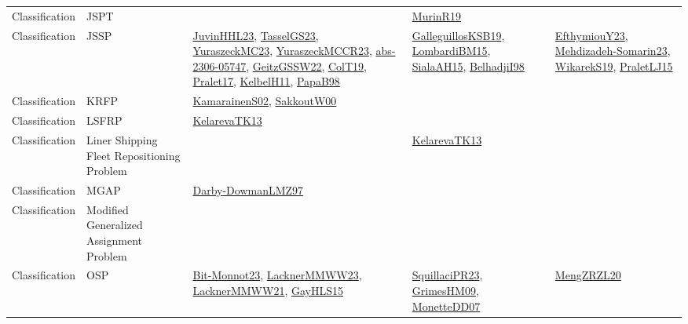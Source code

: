 {\begin{longtable}{lp{3cm}>{\raggedright}p{6cm}>{\raggedright}p{6cm}p{8cm}}
Classification & JSPT &  & \href{papers/MurinR19.pdf}{MurinR19}\cite{MurinR19} & \\
Classification & JSSP & \href{papers/JuvinHHL23.pdf}{JuvinHHL23}\cite{JuvinHHL23}, \href{papers/TasselGS23.pdf}{TasselGS23}\cite{TasselGS23}, \href{papers/YuraszeckMC23.pdf}{YuraszeckMC23}\cite{YuraszeckMC23}, \href{articles/YuraszeckMCCR23.pdf}{YuraszeckMCCR23}\cite{YuraszeckMCCR23}, \href{articles/abs-2306-05747.pdf}{abs-2306-05747}\cite{abs-2306-05747}, \href{papers/GeitzGSSW22.pdf}{GeitzGSSW22}\cite{GeitzGSSW22}, \href{papers/ColT19.pdf}{ColT19}\cite{ColT19}, \href{papers/Pralet17.pdf}{Pralet17}\cite{Pralet17}, \href{articles/KelbelH11.pdf}{KelbelH11}\cite{KelbelH11}, \href{articles/PapaB98.pdf}{PapaB98}\cite{PapaB98} & \href{papers/GalleguillosKSB19.pdf}{GalleguillosKSB19}\cite{GalleguillosKSB19}, \href{papers/LombardiBM15.pdf}{LombardiBM15}\cite{LombardiBM15}, \href{papers/SialaAH15.pdf}{SialaAH15}\cite{SialaAH15}, \href{articles/BelhadjiI98.pdf}{BelhadjiI98}\cite{BelhadjiI98} & \href{papers/EfthymiouY23.pdf}{EfthymiouY23}\cite{EfthymiouY23}, \href{papers/Mehdizadeh-Somarin23.pdf}{Mehdizadeh-Somarin23}\cite{Mehdizadeh-Somarin23}, \href{articles/WikarekS19.pdf}{WikarekS19}\cite{WikarekS19}, \href{papers/PraletLJ15.pdf}{PraletLJ15}\cite{PraletLJ15}\\
Classification & KRFP & \href{papers/KamarainenS02.pdf}{KamarainenS02}\cite{KamarainenS02}, \href{articles/SakkoutW00.pdf}{SakkoutW00}\cite{SakkoutW00} &  & \\
Classification & LSFRP & \href{papers/KelarevaTK13.pdf}{KelarevaTK13}\cite{KelarevaTK13} &  & \\
Classification & Liner Shipping Fleet Repositioning Problem &  & \href{papers/KelarevaTK13.pdf}{KelarevaTK13}\cite{KelarevaTK13} & \\
Classification & MGAP & \href{articles/Darby-DowmanLMZ97.pdf}{Darby-DowmanLMZ97}\cite{Darby-DowmanLMZ97} &  & \\
Classification & Modified Generalized Assignment Problem &  &  & \\
Classification & OSP & \href{papers/Bit-Monnot23.pdf}{Bit-Monnot23}\cite{Bit-Monnot23}, \href{articles/LacknerMMWW23.pdf}{LacknerMMWW23}\cite{LacknerMMWW23}, \href{papers/LacknerMMWW21.pdf}{LacknerMMWW21}\cite{LacknerMMWW21}, \href{papers/GayHLS15.pdf}{GayHLS15}\cite{GayHLS15} & \href{papers/SquillaciPR23.pdf}{SquillaciPR23}\cite{SquillaciPR23}, \href{papers/GrimesHM09.pdf}{GrimesHM09}\cite{GrimesHM09}, \href{papers/MonetteDD07.pdf}{MonetteDD07}\cite{MonetteDD07} & \href{articles/MengZRZL20.pdf}{MengZRZL20}\cite{MengZRZL20}\\

\end{longtable}}
